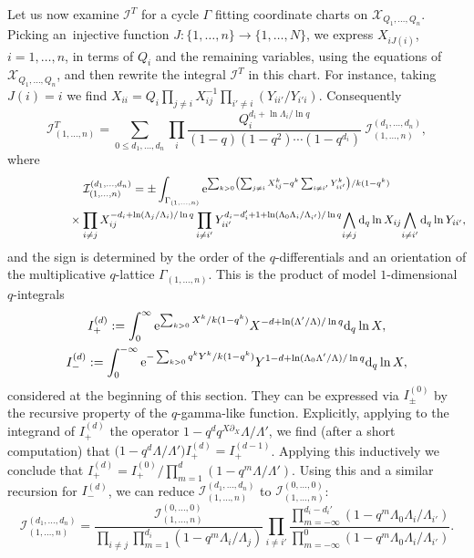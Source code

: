 \documentclass[pdftex]{sigma}
\numberwithin{equation}{section}
\def\I{\mathcal I}
\def\X{\mathcal X}
\def\p{\partial}
\begin{document}
Let us now examine $\I^T$ for a cycle $\Gamma$ fitting coordinate charts on $\X_{Q_1,\dots,Q_n}$. Picking an~injec\-tive function $J\colon \{ 1,\dots, n\} \to \{1,\dots, N\}$, we express $X_{iJ(i)}$, $i=1,\dots,n$, in terms of $Q_i$ and the remaining variables, using the equations of $\X_{Q_1,\dots,Q_n}$, and then rewrite the integral $\I^T$ in this chart. For instance, taking $J(i)=i$
we find $X_{ii}=Q_i\prod_{j\neq i}X_{ij}^{-1}\prod_{i'\neq i}(Y_{ii'}/Y_{i'i})$. Consequently
\[
\I^T_{(1,\dots,n)}=\sum_{0\leq d_1,\dots,d_n}\prod_i \frac{Q_i^{d_i+\ln \Lambda_i/\ln q}}{(1-q)(1-q^2)\cdots (1-q^{d_i})}\ \I^{(d_1,\dots,d_n)}_{(1,\dots,n)},
\]
where
\begin{gather*}
\I^{(d_1,\dots,d_n)}_{(1,\dots,n)}=\pm \int_{\Gamma_{(1,\dots,n)}} {\rm e}^{ \sum_{k>0} \left(\sum_{j\neq i}X_{ij}^k-q^k\sum_{i\neq i'}Y_{ii'}^k\right)/k(1-q^k)}
\\ \hphantom{\I^{(d_1,\dots,d_n)}_{(1,\dots,n)}=}
{}\times\prod_{i\neq j} X_{ij}^{-d_i+\ln (\Lambda_j/\Lambda_i)/\ln q} \prod_{i\neq i'} Y_{ii'}^{d_i-d_i'+1+\ln (\Lambda_0\Lambda_i/\Lambda_{i'})/\ln q} \!\bigwedge_{i\neq j} {\rm d}_q\ln X_{ij} \!\bigwedge_{i\neq i'} {\rm d}_q\ln Y_{ii'},
\end{gather*}
and the sign is determined by the order of the $q$-differentials and an orientation of the multiplicative $q$-lattice $\Gamma_{(1,\dots,n)}$. This is the product
of model $1$-dimensional $q$-integrals
\begin{gather*}
I^{(d)}_{+}:=\int_0^{\infty} {\rm e}^{ \sum_{k>0}X^k/k(1-q^k)} X^{-d+\ln (\Lambda'/\Lambda)/\ln q} {\rm d}_q\ln X,
\\
I^{(d)}_{-}:=\int_0^{-\infty} {\rm e}^{ -\sum_{k>0}q^kY^k/k(1-q^k)} Y^{1-d+\ln (\Lambda_0\Lambda'/\Lambda)/\ln q} {\rm d}_q\ln X,
\end{gather*}
considered at the beginning of this section. They can be expressed via $I_{\pm}^{(0)}$ by the recursive property of the $q$-gamma-like function. Explicitly, applying to the integrand of $I^{(d)}_{+}$ the operator $1-q^d q^{ X\p_X}\Lambda/\Lambda'$, we find (after a short computation) that $\big(1-q^d\Lambda/\Lambda'\big) I_{+}^{(d)} = I^{(d-1)}_{+}$. Applying this inductively we conclude that $I_{+}^{(d)} = I_{+}^{(0)}/\prod_{m=1}^d (1-q^m\Lambda/\Lambda')$. Using this and a similar recursion for $I^{(d)}_{-}$, we can reduce $\I^{(d_1,\dots,d_n)}_{(1,\dots,n)}$ to $\I^{(0,\dots,0)}_{(1,\dots,n)}$:
\[
\I^{(d_1,\dots,d_n)}_{(1,\dots,n)}=\frac{\I^{(0,\dots,0)}_{(1,\dots,n)}}
{ \prod_{i\neq j}\prod_{m=1}^{d_i}(1-q^m\Lambda_i/\Lambda_j)} \prod_{i\neq i'} \frac{\prod_{m=-\infty}^{d_i-d_i'}(1-q^m\Lambda_0\Lambda_i/\Lambda_{i'})}
{\prod_{m=-\infty}^0(1-q^m\Lambda_0\Lambda_i/\Lambda_{i'})}.
\]
\end{document}
